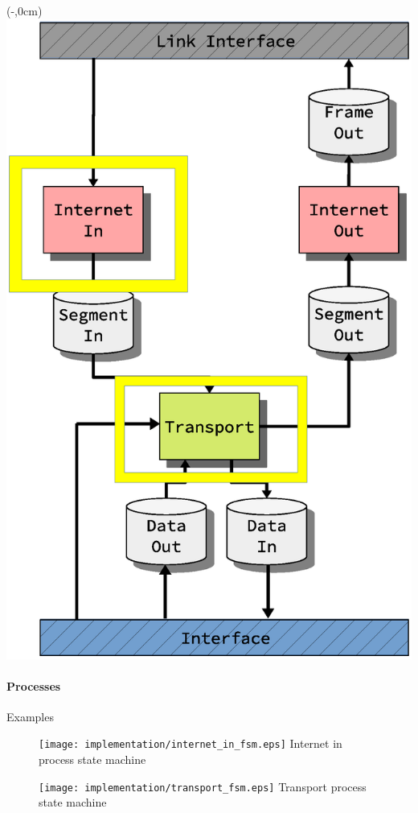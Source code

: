 \begin{frame}[fragile]
    \begin{textblock*}{\displayThumbnail}(\paperwidth-\displayThumbnail-0.2cm,0cm) %
        \colorbox{white}{\includegraphics[width=\textwidth]{implementation/design_2_state_specific.eps}}
    \end{textblock*}
    \frametitle{\ImplementationTitle}
    \framesubtitle{Processes}
    Examples\\
    \begin{minipage}[t]{0.5\textwidth}
        \begin{figure}
            \centering
            \texttt{[image: implementation/internet\_in\_fsm.eps]}
            Internet in process state machine
        \end{figure}
    \end{minipage}%
    \hfill%
    \begin{minipage}[t]{0.5\textwidth}
        \begin{figure}
            \centering
            \texttt{[image: implementation/transport\_fsm.eps]}
            Transport process state machine
        \end{figure}
    \end{minipage}
\end{frame}
